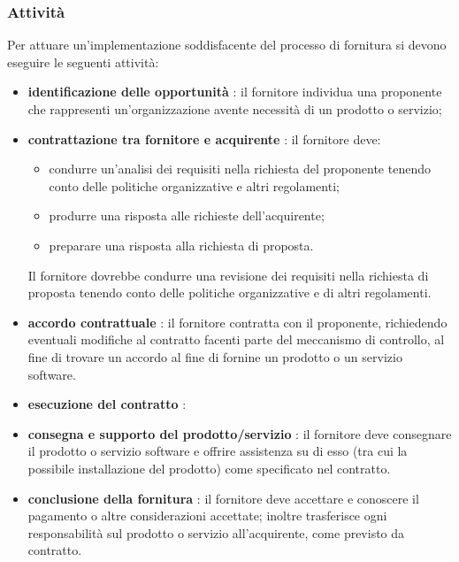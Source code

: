 	\subsubsection{Attività}
	Per attuare un'implementazione soddisfacente del processo di fornitura si devono eseguire le seguenti attività:
\begin{itemize}
\item \textbf{identificazione delle opportunità} : il fornitore individua una proponente che rappresenti un'organizzazione avente necessità di un prodotto o servizio;
\item \textbf{contrattazione tra fornitore e acquirente} : il fornitore deve:
\begin{itemize}
\item condurre un'analisi dei requisiti nella richiesta del proponente tenendo conto delle politiche organizzative e altri regolamenti;
\item produrre una risposta alle richieste dell'acquirente;
\item preparare una risposta alla richiesta di proposta.
\end{itemize}
Il fornitore dovrebbe condurre una revisione dei requisiti nella richiesta di proposta tenendo conto delle politiche organizzative e di altri regolamenti.
\item \textbf{accordo contrattuale} : il fornitore contratta con il proponente, richiedendo eventuali modifiche al contratto facenti parte del meccanismo di controllo, al fine di trovare un accordo al fine di fornine un prodotto o un servizio software.
\item \textbf{esecuzione del contratto} :
\item \textbf{consegna e supporto del prodotto/servizio} : il fornitore deve consegnare il prodotto o servizio software e offrire assistenza su di esso (tra cui la possibile installazione del prodotto) come specificato nel contratto.
\item \textbf{conclusione della fornitura} : il fornitore deve accettare e conoscere il pagamento o altre considerazioni accettate; inoltre trasferisce ogni responsabilità sul prodotto o servizio all'acquirente, come previsto da contratto.
\end{itemize}
